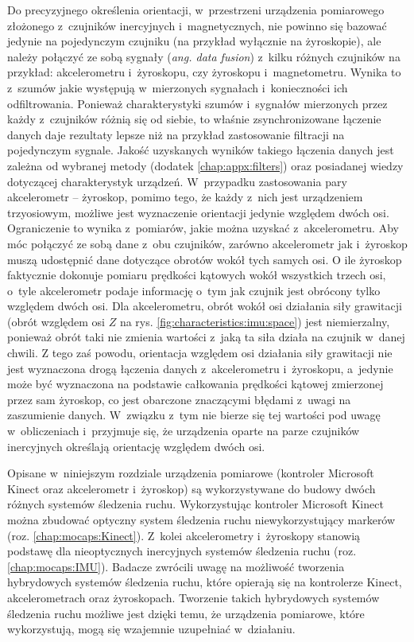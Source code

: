 Do precyzyjnego określenia orientacji, w~przestrzeni urządzenia pomiarowego złożonego z~czujników inercyjnych i~magnetycznych, nie powinno się bazować jedynie na pojedynczym czujniku (na przykład wyłącznie na żyroskopie), ale należy połączyć ze sobą sygnały (\emph{ang. data fusion}) z~kilku różnych czujników na przykład: akcelerometru i~żyroskopu, czy żyroskopu i~magnetometru. Wynika to z~szumów jakie występują w~mierzonych sygnałach i~konieczności ich odfiltrowania. Ponieważ charakterystyki szumów i~sygnałów mierzonych przez każdy z~czujników różnią się od siebie, to właśnie zsynchronizowane łączenie danych daje rezultaty lepsze niż na przykład zastosowanie filtracji na pojedynczym sygnale. Jakość uzyskanych wyników takiego łączenia danych jest zależna od wybranej metody (dodatek \ref{chap:appx:filters}) oraz posiadanej wiedzy dotyczącej charakterystyk urządzeń. W~przypadku zastosowania pary akcelerometr -- żyroskop, pomimo tego, że każdy z~nich jest urządzeniem trzyosiowym, możliwe jest wyznaczenie orientacji jedynie względem dwóch osi. Ograniczenie to wynika z~pomiarów, jakie można uzyskać z~akcelerometru. Aby móc połączyć ze sobą dane z~obu czujników, zarówno akcelerometr jak i~żyroskop muszą udostępnić dane dotyczące obrotów wokół tych samych osi. O ile żyroskop faktycznie dokonuje pomiaru prędkości kątowych wokół wszystkich trzech osi, o~tyle akcelerometr podaje informację o~tym jak czujnik jest obrócony tylko względem dwóch osi. Dla akcelerometru, obrót wokół osi działania siły grawitacji (obrót względem osi $Z$ na rys. \ref{fig:characteristics:imu:space}) jest niemierzalny, ponieważ obrót taki nie zmienia wartości z~jaką ta siła działa na czujnik w~danej chwili. Z tego zaś powodu, orientacja względem osi działania siły grawitacji nie jest wyznaczona drogą łączenia danych z~akcelerometru i~żyroskopu, a~jedynie może być wyznaczona na podstawie całkowania prędkości kątowej zmierzonej przez sam żyroskop, co jest obarczone znaczącymi błędami z~uwagi na zaszumienie danych. W~związku z~tym nie bierze się tej wartości pod uwagę w~obliczeniach i~przyjmuje się, że urządzenia oparte na parze czujników inercyjnych określają orientację względem dwóch osi.

Opisane w~niniejszym rozdziale urządzenia pomiarowe (kontroler Microsoft Kinect oraz akcelerometr i~żyroskop) są wykorzystywane do budowy dwóch różnych systemów śledzenia ruchu. Wykorzystując kontroler Microsoft Kinect można zbudować optyczny system śledzenia ruchu niewykorzystujący markerów (roz. \ref{chap:mocaps:Kinect}). Z~kolei akcelerometry i~żyroskopy stanowią podstawę dla nieoptycznych inercyjnych systemów śledzenia ruchu (roz. \ref{chap:mocaps:IMU}). Badacze zwrócili uwagę na możliwość tworzenia hybrydowych systemów śledzenia ruchu, które opierają się na kontrolerze Kinect, akcelerometrach oraz żyroskopach. Tworzenie takich hybrydowych systemów śledzenia ruchu możliwe jest dzięki temu, że urządzenia pomiarowe, które wykorzystują, mogą się wzajemnie uzupełniać w~działaniu.
											
